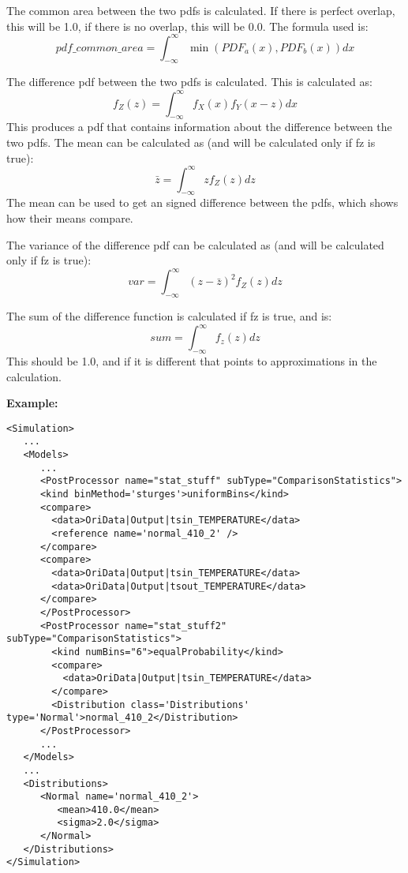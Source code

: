 The common area between the two pdfs is calculated.  If there is
perfect overlap, this will be 1.0, if there is no overlap, this will
be 0.0.  The formula used is:
\begin{equation}
  pdf\_common\_area = \int_{-\infty}^{\infty}{\min(PDF_a(x),PDF_b(x))}dx
\end{equation}

The difference pdf between the two pdfs is calculated.  This is calculated as:
\begin{equation}
  f_Z(z) = \int_{-\infty}^{\infty}f_X(x)f_Y(x-z)dx
\end{equation}
This produces a pdf that contains information about the difference
between the two pdfs.  The mean can be calculated as (and will be
calculated only if fz is true):
\begin{equation}
  \bar{z} = \int_{-\infty}^{\infty}{z f_Z(z)dz}
\end{equation}
The mean can be used to get an signed difference between the pdfs,
which shows how their means compare.

The variance of the difference pdf can be calculated as (and will be
calculated only if fz is true):
\begin{equation}
  var = \int_{-\infty}^{\infty}{(z-\bar{z})^2 f_Z(z)dz}
\end{equation}

The sum of the difference function is calculated if fz is true, and is:
\begin{equation}
  sum = \int_{-\infty}^{\infty}{f_z(z)dz}
\end{equation}
This should be 1.0, and if it is different that
points to approximations in the calculation.


\textbf{Example:}
\begin{lstlisting}[style=XML]
<Simulation>
   ...
   <Models>
      ...
      <PostProcessor name="stat_stuff" subType="ComparisonStatistics">
      <kind binMethod='sturges'>uniformBins</kind>
      <compare>
        <data>OriData|Output|tsin_TEMPERATURE</data>
        <reference name='normal_410_2' />
      </compare>
      <compare>
        <data>OriData|Output|tsin_TEMPERATURE</data>
        <data>OriData|Output|tsout_TEMPERATURE</data>
      </compare>
      </PostProcessor>
      <PostProcessor name="stat_stuff2" subType="ComparisonStatistics">
        <kind numBins="6">equalProbability</kind>
        <compare>
          <data>OriData|Output|tsin_TEMPERATURE</data>
        </compare>
        <Distribution class='Distributions' type='Normal'>normal_410_2</Distribution>
      </PostProcessor>
      ...
   </Models>
   ...
   <Distributions>
      <Normal name='normal_410_2'>
         <mean>410.0</mean>
         <sigma>2.0</sigma>
      </Normal>
   </Distributions>
</Simulation>
\end{lstlisting}

